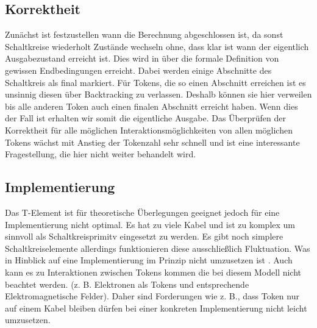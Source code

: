 \documentclass[11pt,a4paper]{article}
\begin{document}
\subsection{Korrektheit}
Zunächst ist festzustellen wann die Berechnung 
abgeschlossen ist, da sonst Schaltkreise wiederholt Zustände wechseln 
ohne, dass klar ist wann der eigentlich Ausgabezustand erreicht ist.
%
Dies wird in \cite{Peper_Fundamentals_2013} über die formale Definition
von gewissen Endbedingungen erreicht.  
%
Dabei werden einige Abschnitte des Schaltkreis als final markiert. 
%
Für Tokens, die so einen Abschnitt erreichen ist es unsinnig  
diesen über Backtracking zu verlassen.
%
Deshalb können sie hier verweilen bis alle anderen Token auch einen finalen 
Abschnitt erreicht haben. 
%
Wenn dies der Fall ist erhalten wir somit die eigentliche Ausgabe.
%
Das Überprüfen der Korrektheit für alle möglichen 
Interaktionsmöglichkeiten von allen möglichen Tokens wächst mit Anstieg 
der Tokenzahl sehr schnell und ist eine interessante Fragestellung,
die hier nicht weiter behandelt wird.


\subsection{Implementierung}
Das T-Element ist für theoretische Überlegungen geeignet jedoch für eine
Implementierung nicht optimal.
%
Es hat zu viele Kabel und ist zu komplex um sinnvoll als Schaltkreisprimitv
eingesetzt zu werden. 
%
Es gibt noch simplere Schaltkreiselemente \cite{Peper_Fundamentals_2013}
allerdings funktionieren diese ausschließlich Fluktuation. 
%
Was in Hinblick auf eine Implementierung im Prinzip nicht umzusetzen ist 
\cite{Peper_Fundamentals_2013}.
%
Auch kann es zu Interaktionen zwischen Tokens kommen die bei diesem Modell
nicht beachtet werden. (z. B. Elektronen als Tokens und entsprechende 
Elektromagnetische Felder).
%
Daher sind Forderungen wie z. B., dass Token nur auf einem Kabel 
bleiben dürfen bei einer konkreten Implementierung nicht leicht umzusetzen.


\end{document}
